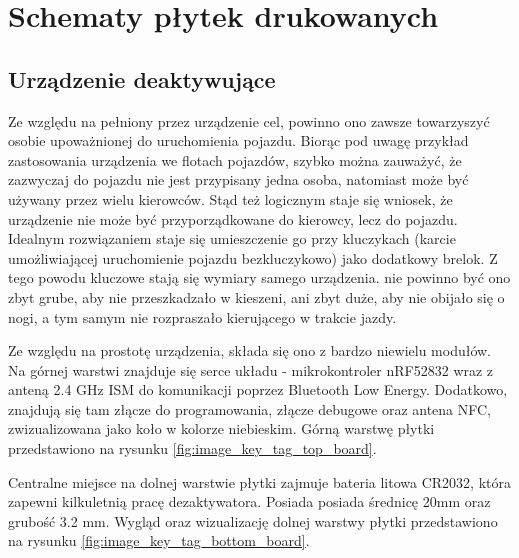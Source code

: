 \chapter{Schematy płytek drukowanych}
\label{boards}

\section{Urządzenie deaktywujące}

Ze względu na pełniony przez urządzenie cel, powinno ono zawsze towarzyszyć osobie upoważnionej do uruchomienia pojazdu. Biorąc pod uwagę przykład zastosowania urządzenia we flotach pojazdów, szybko można zauważyć, że zazwyczaj do pojazdu nie jest przypisany jedna osoba, natomiast może być używany przez wielu kierowców. Stąd też logicznym staje się wniosek, że urządzenie nie może być przyporządkowane do kierowcy, lecz do pojazdu. Idealnym rozwiązaniem staje się umieszczenie go przy kluczykach (karcie umożliwiającej uruchomienie pojazdu bezkluczykowo) jako dodatkowy brelok. Z tego powodu kluczowe stają się wymiary samego urządzenia. nie powinno być ono zbyt grube, aby nie przeszkadzało w kieszeni, ani zbyt duże, aby nie obijało się o nogi, a tym samym nie rozpraszało kierującego w trakcie jazdy.

Ze względu na prostotę urządzenia, składa się ono z bardzo niewielu modułów.
Na górnej warstwi znajduje się serce układu - mikrokontroler nRF52832 wraz z anteną 2.4 GHz ISM do komunikacji poprzez Bluetooth Low Energy. Dodatkowo, znajdują się tam złącze do programowania, złącze debugowe oraz antena NFC, zwizualizowana jako koło w kolorze niebieskim. Górną warstwę płytki przedstawiono na rysunku \ref{fig:image_key_tag_top_board}.

Centralne miejsce na dolnej warstwie płytki zajmuje bateria litowa CR2032, która zapewni kilkuletnią pracę dezaktywatora. Posiada posiada średnicę 20mm oraz grubość 3.2 mm. Wygląd oraz wizualizację dolnej warstwy płytki przedstawiono na rysunku \ref{fig:image_key_tag_bottom_board}.

